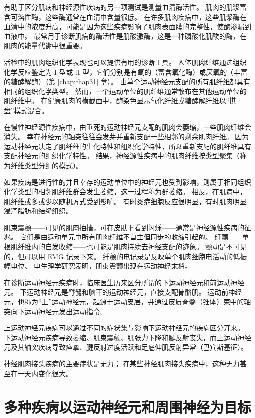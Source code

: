 有助于区分肌病和神经源性疾病的另一项测试是测量血清酶活性。 肌肉的肌浆富含可溶性酶，这些酶通常在血清中含量很低。 在许多肌肉疾病中，这些肌浆酶在血清中的浓度升高，可能是因为这些疾病影响了肌肉表面膜的完整性，使酶渗漏到血液中。 最常用于诊断肌病的酶活性是肌酸激酶，这是一种磷酸化肌酸的酶，在肌肉的能量代谢中很重要。

活检中的肌肉组织化学表现也可以提供有用的诊断工具。 人体肌肉纤维通过组织化学反应鉴定为 I 型或 II 型，它们分别是有氧的（富含氧化酶）或厌氧的（丰富的糖酵解酶）（第 \ref{chap:chap31} 章）。 由单个运动神经元支配的所有肌纤维都具有相同的组织化学类型。 然而，一个运动单位的肌纤维通常散布在其他运动单位的肌纤维中。 在健康肌肉的横截面中，酶染色显示氧化纤维或糖酵解纤维以“棋盘”模式混合。

在慢性神经源性疾病中，由垂死的运动神经元支配的肌肉会萎缩，一些肌肉纤维会消失。 幸存神经元的轴突往往会发芽并重新支配一些相邻的剩余肌肉纤维。 因为运动神经元决定了肌纤维的生化特性和组织化学特性，所以重新支配的肌纤维具有支配神经元的组织化学特性。 结果，神经源性疾病中的肌肉纤维按类型聚集（称为纤维类型分组的模式）。

如果疾病是进行性的并且幸存的运动单位中的神经元也受到影响，则属于相同组织化学类型的相邻肌纤维群会发生萎缩，这一过程称为群萎缩。 相反，在肌病中，肌纤维或多或少以随机方式受到影响。 有时炎症细胞反应很明显，有时肌肉明显浸润脂肪和结缔组织。

肌束震颤——可见的肌肉抽搐，可在皮肤下看到闪烁——通常是神经源性疾病的征兆。 它们是由运动单元中所有肌肉纤维不自主但同步的收缩引起的。 纤颤——单根肌纤维内的自发收缩——也可能是肌肉持续去神经支配的迹象。 颤动是不可见的，但可以用 EMG 记录下来。 纤颤的电记录是反映单个肌肉细胞电活动的低振幅电位。 电生理学研究表明，肌束震颤出现在运动神经末梢。

在诊断运动神经元疾病时，临床医生历来区分所谓的下运动神经元和前运动神经元。 下运动神经元是脊髓和脑干的运动神经元，直接支配骨骼肌。 运动前神经元，也称为“上”运动神经元，起源于运动皮层，并通过皮质脊髓（锥体）束中的轴突向下运动神经元发出运动指令。

上运动神经元疾病可以通过不同的症状集与影响下运动神经元的疾病区分开来。 下运动神经元疾病导致萎缩、肌束震颤、肌张力下降和腱反射丧失，而上运动神经元及其轴突疾病导致痉挛、腱反射过度活跃和足底伸肌反射异常（巴宾斯基征）。

神经肌肉接头疾病的主要症状是无力； 在某些神经肌肉接头疾病中，这种无力甚至在一天内变化很大。


\section{多种疾病以运动神经元和周围神经为目标}


